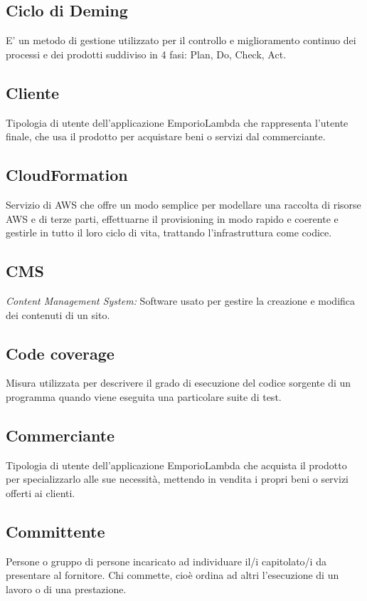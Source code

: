 \subsection*{Ciclo di Deming}
E’ un metodo di gestione utilizzato per il controllo e miglioramento continuo dei processi e dei prodotti
suddiviso in 4 fasi: Plan, Do, Check, Act.

\subsection*{Cliente}
Tipologia di utente dell'applicazione EmporioLambda che rappresenta l'utente finale, che usa il prodotto per acquistare beni o servizi dal commerciante.

\subsection*{CloudFormation}
Servizio di AWS che offre un modo semplice per modellare una raccolta di risorse AWS e di terze parti, effettuarne il provisioning in modo rapido e coerente e gestirle in tutto il loro ciclo di vita, trattando l'infrastruttura come codice.

\subsection*{CMS}
\textit{Content Management System:} Software usato per gestire la creazione e modifica dei contenuti di un sito.

\subsection*{Code coverage}
Misura utilizzata per descrivere il grado di esecuzione del codice sorgente di un programma quando viene eseguita una particolare suite di test.

\subsection*{Commerciante}
Tipologia di utente dell'applicazione EmporioLambda che acquista il prodotto per specializzarlo alle sue necessità, mettendo in vendita i propri beni o servizi offerti ai clienti.

\subsection*{Committente}
Persone o gruppo di persone incaricato ad individuare il/i capitolato/i da presentare al fornitore. Chi commette, cioè ordina ad altri l'esecuzione di un lavoro o di una prestazione.

